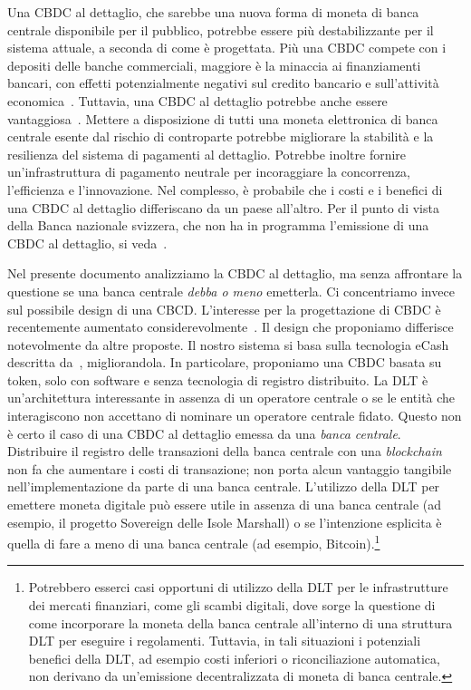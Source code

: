 \documentclass{article}
\begin{document}
Una CBDC al dettaglio, che sarebbe una nuova forma di moneta di banca
centrale disponibile per il pubblico, potrebbe essere più destabilizzante
per il sistema attuale, a seconda di come è progettata. Più una CBDC
compete con i depositi delle banche commerciali, maggiore è la minaccia
ai finanziamenti bancari, con effetti potenzialmente negativi sul credito
bancario e sull'attività economica~\cite[vedi][]{Agur}. Tuttavia, una
CBDC al dettaglio potrebbe anche essere vantaggiosa~\cite[vedi][]{Bordo,Berentsen,Bindseil,Niepelt,Riksbank,BoE}.
Mettere a disposizione di tutti una moneta elettronica di banca centrale
esente dal rischio di controparte potrebbe migliorare la stabilità e la
resilienza del sistema di pagamenti al dettaglio. Potrebbe inoltre fornire
un'infrastruttura di pagamento neutrale per incoraggiare la concorrenza,
l'efficienza e l'innovazione. Nel complesso, è probabile che i costi e i
benefici di una CBDC al dettaglio differiscano da un paese all'altro. Per
il punto di vista della Banca nazionale svizzera, che non ha in programma
l'emissione di una CBDC al dettaglio, si veda~\cite{Jordan}.

Nel presente documento analizziamo la CBDC al dettaglio, ma senza
affrontare la questione se una banca centrale \emph{debba o meno} emetterla.
Ci concentriamo invece sul possibile design di una CBCD. L'interesse
per la progettazione di CBDC è recentemente aumentato
considerevolmente~\cite[si, veda ad esempio,][]{Allen,BoE}. Il design che
proponiamo differisce notevolmente da altre proposte. Il nostro sistema
si basa sulla tecnologia eCash descritta da~\cite{Chaum1983,Chaum1990},
migliorandola. In particolare, proponiamo una CBDC basata su token, solo
con software e senza tecnologia di registro distribuito. La DLT è
un'architettura interessante in assenza di un operatore centrale o se le
entità che interagiscono non accettano di nominare un operatore centrale
fidato. Questo non è certo il caso di una CBDC al dettaglio emessa da una
\emph{banca centrale}. Distribuire il registro delle transazioni della
banca centrale con una \textit{blockchain} non fa che aumentare i costi
di transazione; non porta alcun vantaggio tangibile nell'implementazione
da parte di una banca centrale. L'utilizzo della DLT per emettere moneta
digitale può essere utile in assenza di una banca centrale (ad esempio,
il progetto Sovereign delle Isole Marshall) o se l'intenzione esplicita
è quella di fare a meno di una banca centrale (ad esempio,
Bitcoin).\footnote{Potrebbero esserci casi opportuni di utilizzo della
DLT per le infrastrutture dei mercati finanziari, come gli scambi digitali,
dove sorge la questione di come incorporare la moneta della banca centrale
all'interno di una struttura DLT per eseguire i regolamenti. Tuttavia,
in tali situazioni i potenziali benefici della DLT, ad esempio costi
inferiori o riconciliazione automatica, non derivano da un'emissione
decentralizzata di moneta di banca centrale.}
\end{document}
